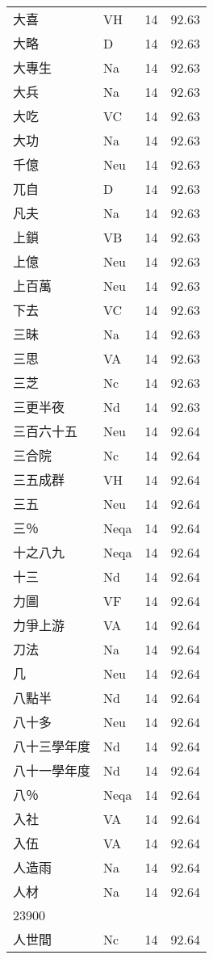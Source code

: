 \documentclass[twocolumn]{book}
\begin{document}
\begin{supertabular}{llrr}
大喜 & VH & 14 &  92.63\\
大略 & D & 14 &  92.63\\
大專生 & Na & 14 &  92.63\\
大兵 & Na & 14 &  92.63\\
大吃 & VC & 14 &  92.63\\
大功 & Na & 14 &  92.63\\
千億 & Neu & 14 &  92.63\\
兀自 & D & 14 &  92.63\\
凡夫 & Na & 14 &  92.63\\
上鎖 & VB & 14 &  92.63\\
上億 & Neu & 14 &  92.63\\
上百萬 & Neu & 14 &  92.63\\
下去 & VC & 14 &  92.63\\
三昧 & Na & 14 &  92.63\\
三思 & VA & 14 &  92.63\\
三芝 & Nc & 14 &  92.63\\
三更半夜 & Nd & 14 &  92.63\\
三百六十五 & Neu & 14 &  92.64\\
三合院 & Nc & 14 &  92.64\\
三五成群 & VH & 14 &  92.64\\
三五 & Neu & 14 &  92.64\\
三％ & Neqa & 14 &  92.64\\
十之八九 & Neqa & 14 &  92.64\\
十三 & Nd & 14 &  92.64\\
力圖 & VF & 14 &  92.64\\
力爭上游 & VA & 14 &  92.64\\
刀法 & Na & 14 &  92.64\\
几 & Neu & 14 &  92.64\\
八點半 & Nd & 14 &  92.64\\
八十多 & Neu & 14 &  92.64\\
八十三學年度 & Nd & 14 &  92.64\\
八十一學年度 & Nd & 14 &  92.64\\
八％ & Neqa & 14 &  92.64\\
入社 & VA & 14 &  92.64\\
入伍 & VA & 14 &  92.64\\
人造雨 & Na & 14 &  92.64\\
人材 & Na & 14 &  92.64\\
23900\\
人世間 & Nc & 14 &  92.64\\

\end{supertabular}
\end{document}
